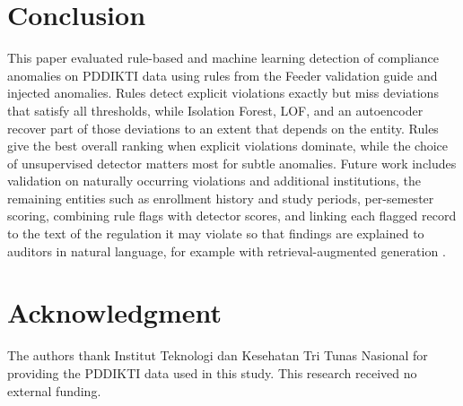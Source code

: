 \documentclass[conference]{IEEEtran}
\newif\ifblind
\begin{document}
\section{Conclusion}
This paper evaluated rule-based and machine learning detection of compliance anomalies on PDDIKTI data using rules from the Feeder validation guide and injected anomalies. Rules detect explicit violations exactly but miss deviations that satisfy all thresholds, while Isolation Forest, LOF, and an autoencoder recover part of those deviations to an extent that depends on the entity. Rules give the best overall ranking when explicit violations dominate, while the choice of unsupervised detector matters most for subtle anomalies. Future work includes validation on naturally occurring violations and additional institutions, the remaining entities such as enrollment history and study periods, per-semester scoring, combining rule flags with detector scores, and linking each flagged record to the text of the regulation it may violate so that findings are explained to auditors in natural language, for example with retrieval-augmented generation \cite{gao2023rag}.

\ifblind\else
\section*{Acknowledgment}
The authors thank Institut Teknologi dan Kesehatan Tri Tunas Nasional for providing the PDDIKTI data used in this study. This research received no external funding.
\fi
\end{document}
